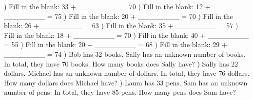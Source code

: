 \documentclass{article}%
\begin{document}
) Fill in the blank: 33 + \_\_\_\_\_\_\_\_ = 70%
\newline%
\newline%
) Fill in the blank: 12 + \_\_\_\_\_\_\_\_ = 75%
\newline%
\newline%
) Fill in the blank: 20 + \_\_\_\_\_\_\_\_ = 70%
\newline%
\newline%
) Fill in the blank: 26 + \_\_\_\_\_\_\_\_ = 63%
\newline%
\newline%
) Fill in the blank: 35 + \_\_\_\_\_\_\_\_ = 57%
\newline%
\newline%
) Fill in the blank: 18 + \_\_\_\_\_\_\_\_ = 70%
\newline%
\newline%
) Fill in the blank: 40 + \_\_\_\_\_\_\_\_ = 55%
\newline%
\newline%
) Fill in the blank: 20 + \_\_\_\_\_\_\_\_ = 68%
\newline%
\newline%
) Fill in the blank: 29 + \_\_\_\_\_\_\_\_ = 74%
\newline%
\newline%
) Bob has 32 books. Sally has an unknown number of books. In total, they have 70 books. How many books does Sally have?%
\newline%
\newline%
) Sally has 22 dollars. Michael has an unknown number of dollars. In total, they have 76 dollars. How many dollars does Michael have?%
\newline%
\newline%
) Laura has 33 pens. Sam has an unknown number of pens. In total, they have 85 pens. How many pens does Sam have?%
\newline%
\newline%
\end{document}
